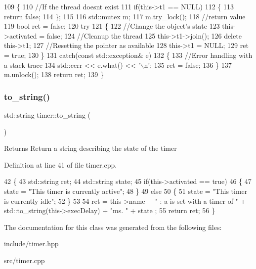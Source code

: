 \begin{DoxyCode}
109 \{
110     \textcolor{comment}{//If the thread doesnt exist}
111     \textcolor{keywordflow}{if}(this->t1 == NULL)
112     \{
113         \textcolor{keywordflow}{return} \textcolor{keyword}{false};
114     \};
115     
116     std::mutex m;
117     m.try\_lock();
118     \textcolor{comment}{//return value}
119     \textcolor{keywordtype}{bool} ret = \textcolor{keyword}{false};
120     \textcolor{keywordflow}{try}
121     \{    
122         \textcolor{comment}{//Change the object's state}
123         this->activated = \textcolor{keyword}{false};
124         \textcolor{comment}{//Cleanup the thread}
125         this->t1->join();
126         \textcolor{keyword}{delete} this->t1;
127         \textcolor{comment}{//Resetting the pointer as available}
128         this->t1 = NULL;
129         ret = \textcolor{keyword}{true};
130     \}
131     \textcolor{keywordflow}{catch}(\textcolor{keyword}{const} std::exception& e)
132     \{
133         \textcolor{comment}{//Error handling with a stack trace}
134         std::cerr << e.what() << \textcolor{charliteral}{'\(\backslash\)n'};
135         ret = \textcolor{keyword}{false};
136     \}
137     m.unlock();
138     \textcolor{keywordflow}{return} ret;
139 \}
\end{DoxyCode}
\mbox{\label{classtimer_a8c068c53de6269fc3ced75cf27bf4ea6}} 
\subsubsection{\texorpdfstring{to\+\_\+string()}{to\_string()}}
{\footnotesize\ttfamily std\+::string timer\+::to\+\_\+string (\begin{DoxyParamCaption}{ }\end{DoxyParamCaption})}

\begin{DoxyReturn}{Returns}
Return a string describing the state of the timer 
\end{DoxyReturn}


Definition at line 41 of file timer.\+cpp.


\begin{DoxyCode}
42 \{
43     std::string ret;
44     std::string state;
45     \textcolor{keywordflow}{if}(this->activated == \textcolor{keyword}{true})
46     \{
47         state = \textcolor{stringliteral}{"This timer is currently active"};
48     \}
49     \textcolor{keywordflow}{else}
50     \{
51         state = \textcolor{stringliteral}{"This timer is currently idle"};
52     \}
53     
54     ret = this->name + \textcolor{stringliteral}{" : a is set with a timer of "} + std::to\_string(this->execDelay) + \textcolor{stringliteral}{"ms. "} + state ;
55     \textcolor{keywordflow}{return} ret;
56 \}
\end{DoxyCode}


The documentation for this class was generated from the following files\+:\begin{DoxyCompactItemize}
\item 
include/timer.\+hpp\item 
src/timer.\+cpp\end{DoxyCompactItemize}
